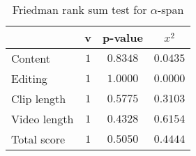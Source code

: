 \begin{table}[ht]
	\begin{center}
	\caption{Friedman rank sum test for $\alpha$-span}
	\label{tab:fried_alpha}
		\begin{tabular}{lccc}
		\toprule
			 & v & p-value & $x^2$\\
			\midrule
			Content & $1$ & $0.8348$ & $0.0435$\\
			Editing & $1$ & $1.0000$ & $0.0000$\\
			Clip length & $1$ & $0.5775$ & $0.3103$\\
			Video length & $1$ & $0.4328$ & $0.6154$\\
			Total score & $1$ & $0.5050$ & $0.4444$\\
		\bottomrule
		\end{tabular}
	\end{center}
\end{table}